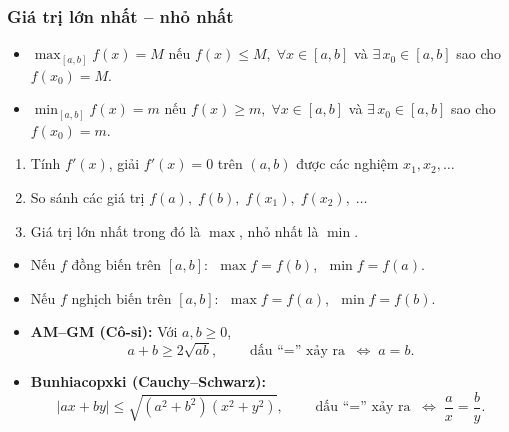 \documentclass[12pt,a4paper]{article}
\begin{document}
\subsubsection{Giá trị lớn nhất -- nhỏ nhất}

\begin{dinhnghia}
  \begin{itemize}
    \item $\displaystyle\max_{[a,b]} f(x) = M$ nếu $f(x) \le M,\;\forall x \in [a,b]$ và $\exists\, x_0 \in [a,b]$ sao cho $f(x_0) = M$.
    \item $\displaystyle\min_{[a,b]} f(x) = m$ nếu $f(x) \ge m,\;\forall x \in [a,b]$ và $\exists\, x_0 \in [a,b]$ sao cho $f(x_0) = m$.
  \end{itemize}
\end{dinhnghia}

\begin{phuongphap}[title={Tìm GTLN--GTNN trên đoạn $[a,b]$}]
  \begin{enumerate}
    \item Tính $f'(x)$, giải $f'(x) = 0$ trên $(a,b)$ được các nghiệm $x_1, x_2, \ldots$
    \item So sánh các giá trị $f(a),\; f(b),\; f(x_1),\; f(x_2),\; \ldots$
    \item Giá trị lớn nhất trong đó là $\max$, nhỏ nhất là $\min$.
  \end{enumerate}
\end{phuongphap}

\begin{tinhchat}
  \begin{itemize}
    \item Nếu $f$ đồng biến trên $[a,b]$:
      $\;\max f = f(b)$, $\;\min f = f(a)$.
    \item Nếu $f$ nghịch biến trên $[a,b]$:
      $\;\max f = f(a)$, $\;\min f = f(b)$.
  \end{itemize}
\end{tinhchat}

\begin{congthuc}[title={Bất đẳng thức thường dùng}]
  \begin{itemize}
    \item \textbf{AM--GM (Cô-si):} Với $a, b \ge 0$,
      \[
        a + b \ge 2\sqrt{ab}, \qquad \text{dấu ``$=$'' xảy ra} \;\Leftrightarrow\; a = b.
      \]
    \item \textbf{Bunhiacopxki (Cauchy--Schwarz):}
      \[
        |ax + by| \le \sqrt{(a^2 + b^2)(x^2 + y^2)}, \qquad \text{dấu ``$=$'' xảy ra} \;\Leftrightarrow\; \frac{a}{x} = \frac{b}{y}.
      \]
  \end{itemize}
\end{congthuc}
\end{document}
